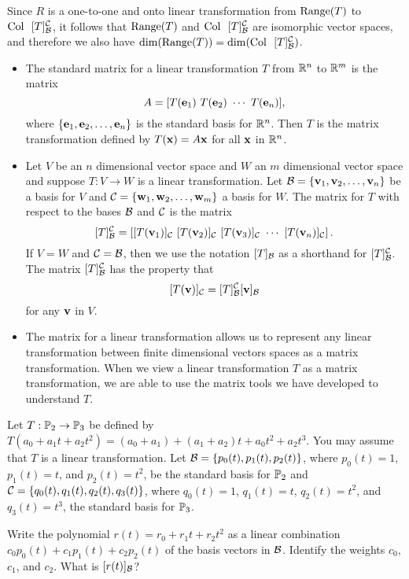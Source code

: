 \begin{example}
 
 	\item Since $R$ is a one-to-one and onto linear transformation from $\text{Range}(T)$ to $\text{Col } \ [T]_{\mathcal{B}}^{\mathcal{C}}$, it follows that $\text{Range}(T)$ and $\text{Col } \ [T]_{\mathcal{B}}^{\mathcal{C}}$ are isomorphic vector spaces, and therefore we also have $\dim(\Range(T)) = \dim(\Col \ [T]_{\CB}^{\CC})$.
	
\ea


\end{example}

 
\label{sec:mtxof_trans_summ}
\begin{itemize}
\item The standard matrix for a linear transformation $T$ from $\mathbb{R}^n$ to $\mathbb{R}^m$ is the matrix 
\[A = [T(\ve_1) \ T(\ve_2) \ \cdots \ T(\ve_n)],\]
where $\{\mathbf{e}_1, \mathbf{e}_2, \ldots, \mathbf{e}_n\}$ is the standard basis for $\mathbb{R}^n$. Then $T$ is the matrix transformation defined by $T(\mathbf{x}) = A\mathbf{x}$ for all $\mathbf{x}$ in $\mathbb{R}^n$. 
\item Let $V$ be an $n$ dimensional vector space and $W$ an $m$ dimensional vector space and suppose $T : V \to W$ is a linear transformation. Let $\mathcal{B} = \{\mathbf{v}_1, \mathbf{v}_2, \ldots, \mathbf{v}_n\}$ be a basis for $V$ and $\mathcal{C} = \{\mathbf{w}_1, \mathbf{w}_2, \ldots, \mathbf{w}_m\}$ a basis for $W$. The matrix for $T$ with respect to the bases $\mathcal{B}$ and $\mathcal{C}$ is the matrix  
\[[T]_{\CB}^{\CC} = \left[  [T(\vv_1)]_{\CC}  \ [T(\vv_2)]_{\CC}  \ [T(\vv_3)]_{\CC}  \ \cdots  \ [T(\vv_n)]_{\CC} \right].\] 
If $V=W$ and $\mathcal{C} = \mathcal{B}$, then we use the notation $[T]_{\mathcal{B}}$ as a shorthand for $[T]_{\mathcal{B}}^{\mathcal{C}}$. The matrix $[T]_{\mathcal{B}}^{\mathcal{C}} $ has the property that
\[[T(\mathbf{v})]_{\mathcal{C}} = [T]_{\mathcal{B}}^{\mathcal{C}} [\mathbf{v}]_{\mathcal{B}}\]
for any $\mathbf{v}$ in $V$. 
\item The matrix for a linear transformation allows us to represent any linear transformation between finite dimensional vectors spaces as a matrix transformation. When we view a linear transformation $T$ as a matrix transformation, we are able to use the matrix tools we have developed to understand $T$.
\end{itemize}

\label{sec:mtxof_trans_exer}
\be
\item  \label{ex:8_b_matrix_transformation} Let $T : \mathbb{P}_2 \to \mathbb{P}_3$ be defined by $T(a_0+a_1t+a_2t^2) = (a_0+a_1) + (a_1+a_2)t + a_0t^2 + a_2t^3$. You may assume that $T$ is a linear transformation. Let $\mathcal{B} = \{p_0(t), p_1(t), p_2(t)\}$, where $p_0(t)=1$, $p_1(t)=t$, and $p_2(t) = t^2$, be the standard basis for $\mathbb{P}_2$ and $\mathcal{C}=\{q_0(t), q_1(t), q_2(t), q_3(t)\}$, where $q_0(t) = 1$, $q_1(t) = t$, $q_2(t)=t^2$, and $q_3(t)=t^3$, the standard basis for $\mathbb{P}_3$.
	\ba
	\item Write the polynomial $r(t) = r_0+r_1t+r_2t^2$ as a linear combination $c_0p_0(t)+c_1p_1(t)+c_2p_2(t)$ of the basis vectors in $\mathcal{B}$. Identify the weights $c_0$, $c_1$, and $c_2$. What is $[r(t)]_{\mathcal{B}}$?
	

